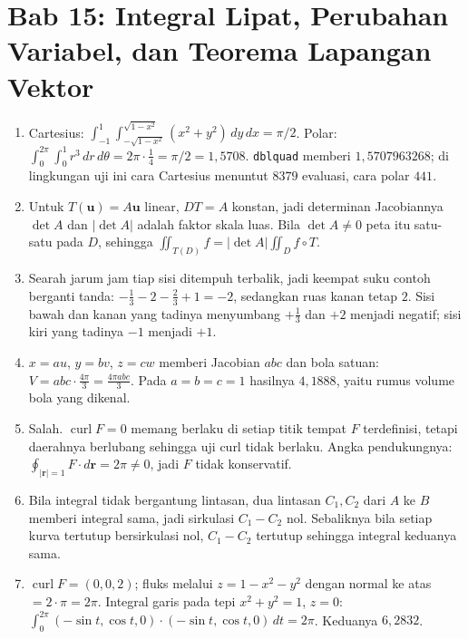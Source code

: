 \section*{Bab 15: Integral Lipat, Perubahan Variabel, dan Teorema Lapangan Vektor}
\begin{enumerate}[label=\textbf{15.\arabic*}]
  \item Cartesius: $\int_{-1}^{1}\int_{-\sqrt{1-x^{2}}}^{\sqrt{1-x^{2}}}
        (x^{2}+y^{2})\,dy\,dx=\pi/2$. Polar:
        $\int_{0}^{2\pi}\int_{0}^{1}r^{3}\,dr\,d\theta
        =2\pi\cdot\tfrac14=\pi/2=1{,}5708$. \texttt{dblquad} memberi
        $1{,}5707963268$; di lingkungan uji ini cara Cartesius menuntut $8379$
        evaluasi, cara polar $441$.

  \item Untuk $T(\mathbf{u})=A\mathbf{u}$ linear, $DT=A$ konstan, jadi
        determinan Jacobiannya $\det A$ dan $\lvert\det A\rvert$ adalah faktor
        skala luas. Bila $\det A\ne0$ peta itu satu-satu pada $D$, sehingga
        $\iint_{T(D)}f=\lvert\det A\rvert\iint_{D}f\circ T$.

  \item Searah jarum jam tiap sisi ditempuh terbalik, jadi keempat suku contoh
        berganti tanda: $-\tfrac13-2-\tfrac23+1=-2$, sedangkan ruas kanan tetap
        $2$. Sisi bawah dan kanan yang tadinya menyumbang $+\tfrac13$ dan $+2$
        menjadi negatif; sisi kiri yang tadinya $-1$ menjadi $+1$.

  \item $x=au$, $y=bv$, $z=cw$ memberi Jacobian $abc$ dan bola satuan:
        $V=abc\cdot\frac{4\pi}{3}=\frac{4\pi abc}{3}$. Pada $a=b=c=1$
        hasilnya $4{,}1888$, yaitu rumus volume bola yang dikenal.

  \item Salah. $\operatorname{curl}F=0$ memang berlaku di setiap titik tempat $F$
        terdefinisi, tetapi daerahnya berlubang sehingga uji curl tidak berlaku.
        Angka pendukungnya: $\oint_{\lvert\mathbf{r}\rvert=1}F\cdot d\mathbf{r}
        =2\pi\ne0$, jadi $F$ tidak konservatif.

  \item Bila integral tidak bergantung lintasan, dua lintasan $C_{1},C_{2}$ dari
        $A$ ke $B$ memberi integral sama, jadi sirkulasi $C_{1}-C_{2}$ nol.
        Sebaliknya bila setiap kurva tertutup bersirkulasi nol, $C_{1}-C_{2}$
        tertutup sehingga integral keduanya sama.

  \item $\operatorname{curl}F=(0,0,2)$; fluks melalui $z=1-x^{2}-y^{2}$ dengan
        normal ke atas $=2\cdot\pi=2\pi$. Integral garis pada tepi
        $x^{2}+y^{2}=1$, $z=0$:
        $\int_{0}^{2\pi}(-\sin t,\cos t,0)\cdot(-\sin t,\cos t,0)\,dt=2\pi$.
        Keduanya $6{,}2832$.


\end{enumerate}
